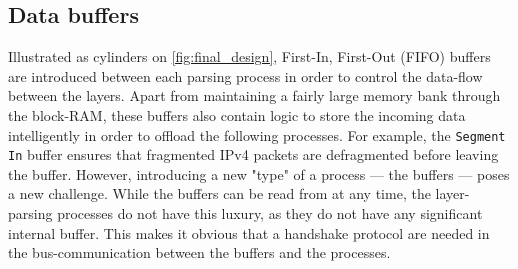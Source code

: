 \subsection{Data buffers} \label{sec:data_buffers}
Illustrated as cylinders on \autoref{fig:final_design}, First-In, First-Out (FIFO)
buffers are introduced between each parsing process in order to control the data-flow
between the layers. Apart from maintaining a fairly large memory bank through
the block-RAM, these buffers also contain logic to store the incoming data
intelligently in order to offload the following processes. For example, the
\texttt{Segment In} buffer ensures that fragmented IPv4 packets are defragmented
before leaving the buffer.
However, introducing a new "type" of a process --- the buffers --- poses a new
challenge. While the buffers can be read from at any time, the layer-parsing
processes do not have this luxury, as they do not have any significant internal
buffer. This makes it obvious that a handshake protocol are needed
in the bus-communication between the buffers and the processes.

